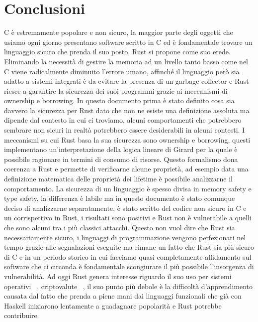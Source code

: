 \documentclass[Lau,binding=0.6cm]{sapthesis}
\begin{document}
\chapter{Conclusioni}
C è estremamente popolare e non sicuro, la maggior parte degli oggetti che usiamo ogni giorno presentano software scritto in C ed è fondamentale trovare un linguaggio sicuro che prenda il suo posto, Rust si propone come suo erede.
Eliminando la necessità di gestire la memoria ad un livello tanto basso come nel C viene radicalmente diminuito l'errore umano, affinché il linguaggio però sia adatto a sistemi integrati è da evitare la presenza di un garbage collector e Rust riesce a garantire la sicurezza dei suoi programmi grazie ai meccanismi di ownership e borrowing. 
In questo documento prima è stato definito cosa sia davvero la sicurezza per Rust dato che non ne esiste una definizione assoluta ma dipende dal contesto in cui ci troviamo, alcuni comportamenti che potrebbero sembrare non sicuri in realtà potrebbero essere desiderabili in alcuni contesti.
I meccanismi su cui Rust basa la sua sicurezza sono ownership e borrowing, questi implementano un'interpretazione della logica lineare di Girard per la quale è possibile ragionare in termini di consumo di risorse.
Questo formalismo dona coerenza a Rust e permette di verificarne alcune proprietà, ad esempio data una definizione matematica delle proprietà dei lifetime è possibile analizzarne il comportamento.
La sicurezza di un linguaggio è spesso divisa in memory safety e type safety, la differenza è labile ma in questo documento è stato comunque deciso di analizzarne separatamente, è stato scritto del codice non sicuro in C e un corrispettivo in Rust, i risultati sono positivi e Rust non è vulnerabile a quelli che sono alcuni tra i più classici attacchi.
Questo non vuol dire che Rust sia necessariamente sicuro, i linguaggi di programmazione vengono perfezionati nel tempo grazie alle segnalazioni eseguite ma rimane un fatto che Rust sia più sicuro di C e in un periodo storico in cui facciamo quasi completamente affidamento sul software che ci circonda è fondamentale scongiurare il più possibile l'insorgenza di vulnerabilità. 
Ad oggi Rust genera interesse riguardo il suo uso per sistemi operativi ~\cite{redox}, criptovalute ~\cite{libra}, il suo punto più debole è la difficoltà d'apprendimento causata dal fatto che prenda a piene mani dai linguaggi funzionali che già con Haskell iniziarono lentamente a guadagnare popolarità e Rust potrebbe contribuire.


\backmatter

\cleardoublepage
{}
{}
\end{document}
